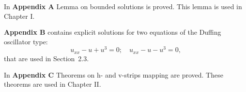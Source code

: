 \documentclass[candidate, href, colorlinks]{disser}
\begin{document}
In \textbf{Appendix A} Lemma on bounded solutions is proved.
This lemma is used in Chapter I.

\textbf{Appendix B} contains explicit solutions for two equations of the Duffing oscillator type: 
\begin{equation}
	u_{xx} - u + u^3 = 0; \quad u_{xx} - u - u^3 = 0,
\end{equation}
that are used in Section~2.3.

In \textbf{Appendix C} Theorems on h- and v-strips mapping are proved.
These theorems are used in Chapter II.


\def\thispagestyle#1{}
\renewcommand{\bibname}{\protect\leftline{\large List of Publications on the Topic of Dissertation}}
\printbibliography[keyword=own]


\end{document}
